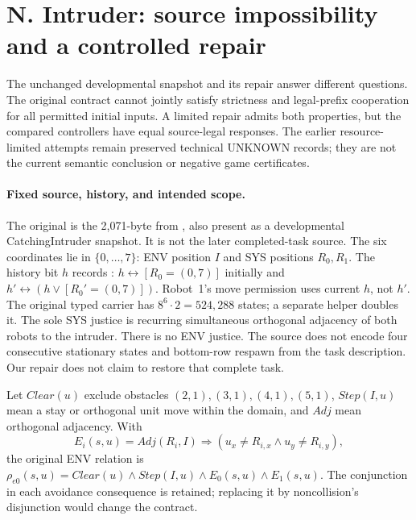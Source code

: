 \section*{N. Intruder: source impossibility and a controlled repair}
\label{app:intruder-bounded}
The unchanged developmental snapshot and its repair answer different
questions. The original contract cannot jointly satisfy strictness and
legal-prefix cooperation for all permitted initial inputs. A limited
repair admits both properties, but the compared controllers have equal
source-legal responses. The earlier resource-limited attempts remain
preserved technical UNKNOWN records; they are not the current semantic
conclusion or negative game certificates.

\paragraph{Fixed source, history, and intended scope.}
The original is the 2,071-byte  from
\cite{kindartifact}, also present as a developmental CatchingIntruder
snapshot. It is not the later completed-task source. The six coordinates
lie in $\{0,\ldots,7\}$: ENV position $I$ and SYS positions $R_0,R_1$.
The history bit $h$ records :
$h\leftrightarrow[R_0=(0,7)]$ initially and
$h'\leftrightarrow(h\lor[R_0'=(0,7)])$.
Robot~1's move permission uses current $h$, not $h'$. The original typed
carrier has $8^6\cdot2=524,288$ states; a separate helper doubles it.
The sole SYS justice is recurring simultaneous orthogonal adjacency
of both robots to the intruder. There is no ENV justice.
The source does not encode four consecutive stationary states and
bottom-row respawn from the task description. Our repair does not
claim to restore that complete task.

Let $Clear(u)$ exclude obstacles $(2,1),(3,1),(4,1),(5,1)$,
$Step(I,u)$ mean a stay or orthogonal unit move within the domain,
and $Adj$ mean orthogonal adjacency. With
\[
 E_i(s,u)=Adj(R_i,I)\Rightarrow
             (u_x\ne R_{i,x}\land u_y\ne R_{i,y}),
\]
the original ENV relation is
$\rho_{e0}(s,u)=Clear(u)\land Step(I,u)\land E_0(s,u)\land E_1(s,u)$.
The conjunction in each avoidance consequence is retained; replacing it
by noncollision's disjunction would change the contract.


